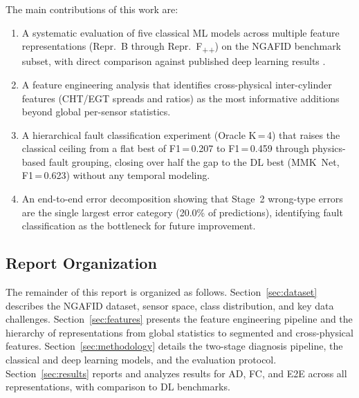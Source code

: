 The main contributions of this work are:

\begin{enumerate}
    \item A systematic evaluation of five classical ML models across multiple
          feature representations (Repr.~B through Repr.~F\textsubscript{++}) on
          the NGAFID benchmark subset, with direct comparison against published
          deep learning results \cite{lmsd2025}.
    \item A feature engineering analysis that identifies cross-physical
          inter-cylinder features (CHT/EGT spreads and ratios) as the most
          informative additions beyond global per-sensor statistics.
    \item A hierarchical fault classification experiment (Oracle K\,=\,4) that
          raises the classical ceiling from a flat best of F1\,=\,0.207 to
          F1\,=\,0.459 through physics-based fault grouping, closing over half the
          gap to the DL best (MMK~Net, F1\,=\,0.623) without any temporal modeling.
    \item An end-to-end error decomposition showing that Stage~2 wrong-type errors
          are the single largest error category (20.0\% of predictions),
          identifying fault classification as the bottleneck for future improvement.
\end{enumerate}

\subsection{Report Organization}

The remainder of this report is organized as follows.
Section~\ref{sec:dataset} describes the NGAFID dataset, sensor space, class
distribution, and key data challenges.
Section~\ref{sec:features} presents the feature engineering pipeline and the
hierarchy of representations from global statistics to segmented and
cross-physical features.
Section~\ref{sec:methodology} details the two-stage diagnosis pipeline, the
classical and deep learning models, and the evaluation protocol.
Section~\ref{sec:results} reports and analyzes results for AD, FC, and E2E
across all representations, with comparison to DL benchmarks.
